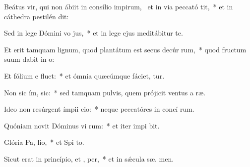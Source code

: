 \item Beátus vir, qui non ábiit in consílio impirum,~\pscross{} et in via peccató  tit,~* et in cáthedra pestilén  dit:
\item Sed in lege Dómini vo jus,~* et in lege ejus meditábitur   te.
\item Et erit tamquam lignum, quod plantátum est secus decúr rum,~* quod fructum suum dabit in  o:
\item Et fólium e  fluet:~* et ómnia quæcúmque fáciet, tur.
\item Non sic ím,  sic:~* sed tamquam pulvis, quem prójicit ventus a  ræ.
\item Ideo non resúrgent ímpii  cio:~* neque peccatóres in concí rum.
\item Quóniam novit Dóminus vi rum:~* et iter impi bit.
\item Glória Pa,  lio,~* et Spi to.
\item Sicut erat in princípio, et ,  per,~* et in sǽcula sæ. men.
